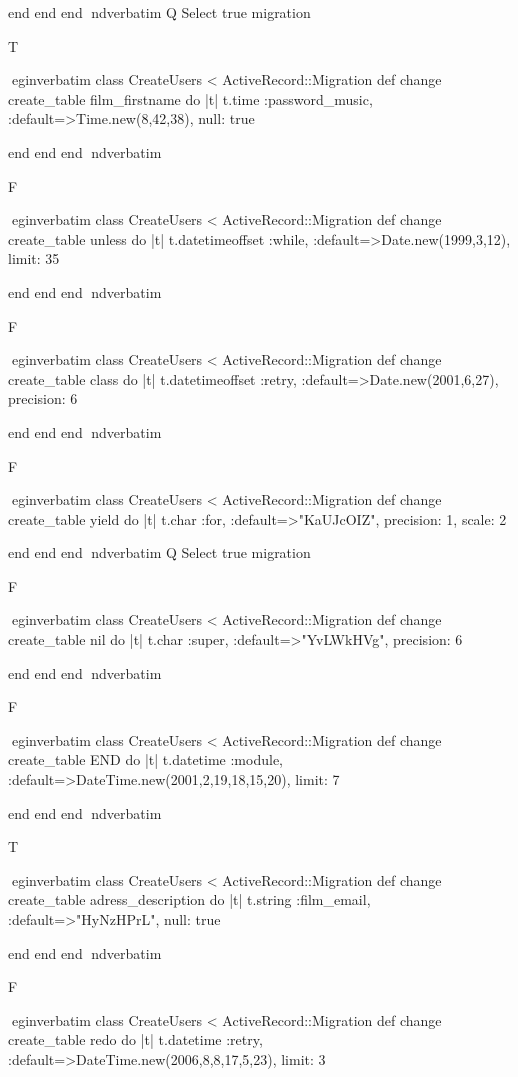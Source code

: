     end 
  end 
end
nd{verbatim}
Q
 Select true migration

T

egin{verbatim}
 class CreateUsers < ActiveRecord::Migration 
  def change 
    create_table film_firstname do |t| 
      t.time :password_music, :default=>Time.new(8,42,38), null: true
    
    end 
  end 
end
nd{verbatim}

F

egin{verbatim}
 class CreateUsers < ActiveRecord::Migration 
  def change 
    create_table unless do |t| 
      t.datetimeoffset :while, :default=>Date.new(1999,3,12), limit: 35
    
    end 
  end 
end
nd{verbatim}

F

egin{verbatim}
 class CreateUsers < ActiveRecord::Migration 
  def change 
    create_table class do |t| 
      t.datetimeoffset :retry, :default=>Date.new(2001,6,27), precision: 6
    
    end 
  end 
end
nd{verbatim}

F

egin{verbatim}
 class CreateUsers < ActiveRecord::Migration 
  def change 
    create_table yield do |t| 
      t.char :for, :default=>"KaUJcOIZ", precision: 1, scale: 2
    
    end 
  end 
end
nd{verbatim}
Q
 Select true migration

F

egin{verbatim}
 class CreateUsers < ActiveRecord::Migration 
  def change 
    create_table nil do |t| 
      t.char :super, :default=>"YvLWkHVg", precision: 6
    
    end 
  end 
end
nd{verbatim}

F

egin{verbatim}
 class CreateUsers < ActiveRecord::Migration 
  def change 
    create_table END do |t| 
      t.datetime :module, :default=>DateTime.new(2001,2,19,18,15,20), limit: 7
    
    end 
  end 
end
nd{verbatim}

T

egin{verbatim}
 class CreateUsers < ActiveRecord::Migration 
  def change 
    create_table adress_description do |t| 
      t.string :film_email, :default=>"HyNzHPrL", null: true
    
    end 
  end 
end
nd{verbatim}

F

egin{verbatim}
 class CreateUsers < ActiveRecord::Migration 
  def change 
    create_table redo do |t| 
      t.datetime :retry, :default=>DateTime.new(2006,8,8,17,5,23), limit: 3
    
